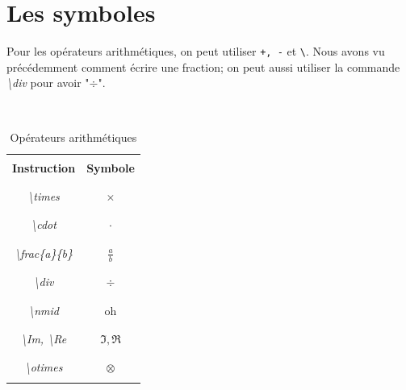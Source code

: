 \documentclass[a4paper, 10pt]{book}
\begin{document}
\section{Les symboles \\}

Pour les opérateurs arithmétiques, on peut utiliser \texttt{+, -} et \texttt{\textbackslash}. Nous avons vu précédemment comment écrire une fraction; on peut aussi utiliser la commande \textit{\textbackslash div} pour avoir "$\div$". 

\pagebreak

\begin{table}[ht]
\caption{\label{}Opérateurs arithmétiques}
\textit{\\}
\centering
\begin{tabular}{|c|c|}
\hline \\
\textbf{Instruction} & \textbf{Symbole} \\ \\
\hline \hline \\
\textit{\textbackslash times} & $\times $ \\ \\
\hline \\
\textit{\textbackslash cdot} & $ \cdot $ \\ \\
\hline \\
\textit{\textbackslash frac\{a\}\{b\}} & $ \frac{a}{b} $ \\ \\
\hline \\
\textit{\textbackslash div} & $ \div $ \\ \\
\hline \\
\textit{\textbackslash nmid} & oh \\ \\
\hline \\
\textit{\textbackslash Im, \textbackslash Re} & $ \Im , \Re $ \\ \\
\hline \\
\textit{\textbackslash otimes} & $ \otimes $ \\ \\
\hline 
\end{tabular}
\end{table}

\pagebreak
\pagebreak
\end{document}
